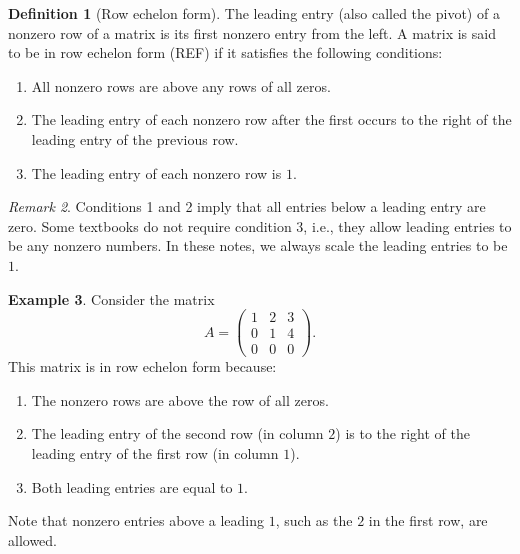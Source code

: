 \documentclass[11pt]{article}
\theoremstyle{definition}
\newtheorem{definition}{Definition}[section]
\newtheorem{example}[definition]{Example}
\theoremstyle{plain}
\theoremstyle{remark}
\newtheorem{remark}[definition]{Remark}
\begin{document}
\begin{definition}[Row echelon form]
    The leading entry (also called the pivot) of a nonzero row of a matrix is its first nonzero entry from the left. A matrix is said to be in row echelon form (REF) if it satisfies the following conditions:
    \begin{enumerate}
        \item All nonzero rows are above any rows of all zeros.
        \item The leading entry of each nonzero row after the first occurs to the right of the leading entry of the previous row.
        \item The leading entry of each nonzero row is $1$.
    \end{enumerate}
\end{definition}

\begin{remark}
    Conditions 1 and 2 imply that all entries below a leading entry are zero. Some textbooks do not require condition 3, i.e., they allow leading entries to be any nonzero numbers. In these notes, we always scale the leading entries to be $1$.
\end{remark}

\begin{example}\label{ex:refA}
    Consider the matrix
    \[A = \begin{pmatrix}
        1 & 2 & 3 \\
        0 & 1 & 4 \\
        0 & 0 & 0
    \end{pmatrix}.\]
    This matrix is in row echelon form because:
    \begin{enumerate}
        \item The nonzero rows are above the row of all zeros.
        \item The leading entry of the second row (in column $2$) is to the right of the leading entry of the first row (in column $1$).
        \item Both leading entries are equal to $1$.
    \end{enumerate}
    Note that nonzero entries above a leading $1$, such as the $2$ in the first row, are allowed.
\end{example}
\end{document}
